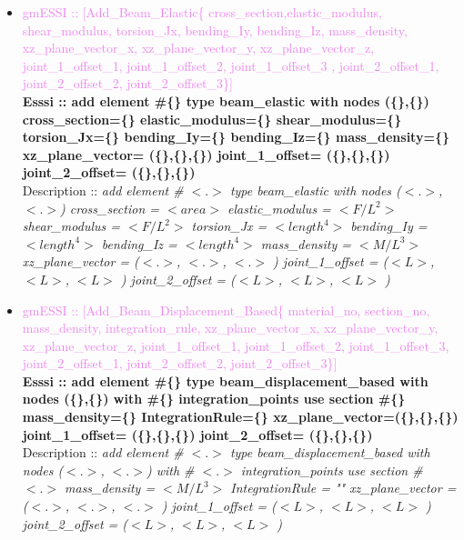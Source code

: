 \documentclass[11pt]{article}
\begin{document}
\begin{itemize}
    \item \textcolor{violet}{gmESSI :: [Add\_Beam\_Elastic\{ cross\_section,elastic\_modulus, shear\_modulus, torsion\_Jx, bending\_Iy, bending\_Iz, mass\_density, xz\_plane\_vector\_x, xz\_plane\_vector\_y, xz\_plane\_vector\_z, joint\_1\_offset\_1, joint\_1\_offset\_2, joint\_1\_offset\_3 , joint\_2\_offset\_1, joint\_2\_offset\_2, joint\_2\_offset\_3\}]} \\          
    \textbf{Esssi :: add element \#\{\} type beam\_elastic with nodes (\{\},\{\}) cross\_section=\{\} elastic\_modulus=\{\} shear\_modulus=\{\} torsion\_Jx=\{\} bending\_Iy=\{\} bending\_Iz=\{\} mass\_density=\{\}  xz\_plane\_vector= (\{\},\{\},\{\}) joint\_1\_offset= (\{\},\{\},\{\}) joint\_2\_offset= (\{\},\{\},\{\})}\\
    Description :: \textit{ add element \# $<.>$ type beam\_elastic with nodes ($<.>$, $<.>$) cross\_section = $<area>$ elastic\_modulus = $<F/L^2>$ shear\_modulus = $<F/L^2>$ torsion\_Jx = $<length^4>$ bending\_Iy = $<length^4>$ bending\_Iz = $<length^4>$ mass\_density = $<M/L^3>$  xz\_plane\_vector = ($<.>$, $<.>$, $<.>$ ) joint\_1\_offset = ($<L>$, $<L>$, $<L>$ ) joint\_2\_offset = ($<L>$, $<L>$, $<L>$ )}

    \item \textcolor{violet}{gmESSI :: [Add\_Beam\_Displacement\_Based\{ material\_no, section\_no, mass\_density, integration\_rule, xz\_plane\_vector\_x, xz\_plane\_vector\_y, xz\_plane\_vector\_z, joint\_1\_offset\_1, joint\_1\_offset\_2, joint\_1\_offset\_3, joint\_2\_offset\_1, joint\_2\_offset\_2, joint\_2\_offset\_3\}]} \\
    \textbf{Esssi :: add element \#\{\} type beam\_displacement\_based with nodes (\{\},\{\}) with \#\{\}  integration\_points use section \#\{\} mass\_density=\{\} IntegrationRule=\{\}  xz\_plane\_vector=(\{\},\{\},\{\}) joint\_1\_offset= (\{\},\{\},\{\}) joint\_2\_offset= (\{\},\{\},\{\})}\\
    Description :: \textit{ add element \# $<.>$ type beam\_displacement\_based with nodes ($<.>$, $<.>$) with \# $<.>$ integration\_points use section \# $<.>$ mass_density = $<M/L^3>$ IntegrationRule = ""  xz\_plane\_vector = ($<.>$, $<.>$, $<.>$ ) joint\_1\_offset = ($<L>$, $<L>$, $<L>$ ) joint\_2\_offset = ($<L>$, $<L>$, $<L>$ )}


\end{itemize}
\end{document}
